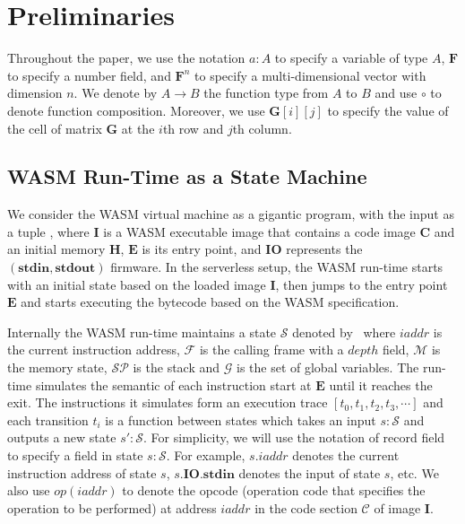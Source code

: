 \section{Preliminaries}
\label{chp:preliminary}
Throughout the paper, we use the notation $a:A$ to specify a variable of type $A$,  $\mathbf{F}$ to specify a number field, and $\mathbf{F}^{n}$ to specify a multi-dimensional vector with dimension $n$. We denote  by $A \rightarrow B$ the function type from $A$ to $B$ and use $\circ$ to denote function composition. Moreover, we use $\mathbf{G}[i][j]$ to specify the value of the cell of matrix $\mathbf{G}$ at the $i$th row and $j$th column.

\subsection{WASM Run-Time as a State Machine}
\label{chp:exec-trace}
We consider the WASM virtual machine as a gigantic program, with the input as a tuple \initstate, where $\mathbf{I}$ is a WASM executable image that contains a code image $\mathbf{C}$ and an initial memory $\mathbf{H}$, $\mathbf{E}$ is its entry point, and $\mathbf{IO}$ represents the $(\mathbf{stdin}, \mathbf{stdout})$ firmware. In the serverless setup, the WASM run-time starts with an initial state based on the loaded image $\mathbf{I}$, then jumps to the entry point $\mathbf{E}$ and starts executing the bytecode based on the WASM specification. 

Internally the WASM run-time maintains a state $\mathcal{S}$ denoted by \fullstate \, where $iaddr$ is the current instruction address, $\mathcal{F}$ is the calling frame with a $depth$ field, $\mathcal{M}$ is the memory state, $\mathcal{SP}$ is the stack and $\mathcal{G}$ is the set of global variables. The run-time simulates the semantic of each instruction start at $\mathbf{E}$ until it reaches the exit. The instructions it simulates form an execution trace $\left[t_0, t_1, t_2, t_3, \cdots \right]$ and each transition $t_i$ is a function between states which takes an input $s:\mathcal{S}$ and outputs a new state $s':\mathcal{S}$. For simplicity, we will use the notation of record field to specify a field in state $s:\mathcal{S}$. For example, $s.iaddr$ denotes the current instruction address of state $s$, $s.\mathbf{IO}.\mathbf{stdin}$ denotes the input of state $s$, etc. We also use $op(iaddr)$ to denote the opcode (operation code that specifies the operation to be performed) at address $iaddr$ in the code section $\mathcal{C}$ of image $\mathbf{I}$.

